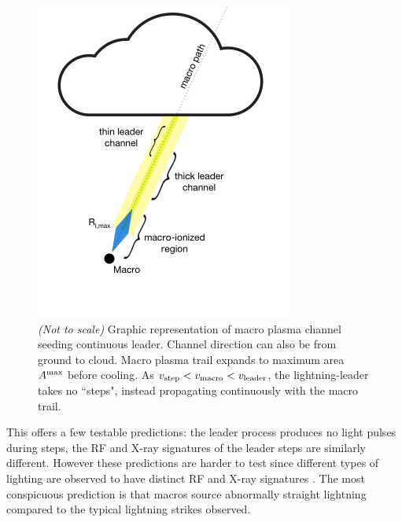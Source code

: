 \documentclass[%
 reprint,
 amsmath,amssymb,
 aps,
]{revtex4-2}
\newcommand{\vtwo}[1]{{\color{black} #1}}
\begin{document}
        \begin{figure}[ht]
            \centering
            \includegraphics[width=\linewidth]{macro_schematic/macro_schematic.pdf}
            \caption{\textit{(Not to scale)} Graphic representation of macro plasma channel seeding continuous leader. \vtwo{Channel direction can also be from ground to cloud. Macro plasma trail expands to maximum area $A^{\rm{max}}$ before cooling.} As $v_{\rm{step}} < v_{\rm{macro}} < v_{\rm{leader}}$, the lightning-leader takes no ``steps", instead propagating continuously with the macro trail.}
            \label{fig:macro_graphic}
        \end{figure}

        This offers a few testable predictions: the leader process produces no light pulses during steps, the RF and X-ray signatures of the leader steps are similarly different. \vtwo{However these predictions are harder to test since different types of lighting are observed to have distinct RF and X-ray signatures \vtwo{\citep{Hare2020}}.} The most conspicuous prediction is that {macros source abnormally straight lightning} compared to the typical lightning strikes observed.
\end{document}
